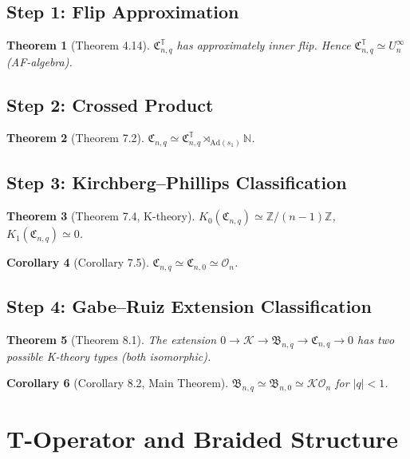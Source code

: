 \documentclass{article}
\newtheorem{theorem}{Theorem}[section]
\newtheorem{corollary}[theorem]{Corollary}
\begin{document}
\subsection{Step 1: Flip Approximation}
\begin{theorem}[Theorem 4.14]
$\mathfrak{C}_{n,q}^{\mathbb{T}}$ has approximately inner flip.
Hence $\mathfrak{C}_{n,q}^{\mathbb{T}} \simeq U_n^\infty$ (AF-algebra).
\end{theorem}

\subsection{Step 2: Crossed Product}
\begin{theorem}[Theorem 7.2]
$\mathfrak{C}_{n,q} \simeq \mathfrak{C}_{n,q}^{\mathbb{T}} \rtimes_{\mathrm{Ad}(s_1)} \mathbb{N}$.
\end{theorem}

\subsection{Step 3: Kirchberg--Phillips Classification}
\begin{theorem}[Theorem 7.4, K-theory]
$K_0(\mathfrak{C}_{n,q}) \simeq \mathbb{Z}/(n-1)\mathbb{Z}$, $K_1(\mathfrak{C}_{n,q}) \simeq 0$.
\end{theorem}
\begin{corollary}[Corollary 7.5]
$\mathfrak{C}_{n,q} \simeq \mathfrak{C}_{n,0} \simeq \mathcal{O}_n$.
\end{corollary}

\subsection{Step 4: Gabe--Ruiz Extension Classification}
\begin{theorem}[Theorem 8.1]
The extension $0 \to \mathcal{K} \to \mathfrak{B}_{n,q} \to \mathfrak{C}_{n,q} \to 0$ has
two possible K-theory types (both isomorphic).
\end{theorem}
\begin{corollary}[Corollary 8.2, Main Theorem]
$\mathfrak{B}_{n,q} \simeq \mathfrak{B}_{n,0} \simeq \mathcal{KO}_n$ for $|q| < 1$.
\end{corollary}

\section{T-Operator and Braided Structure}
\end{document}
